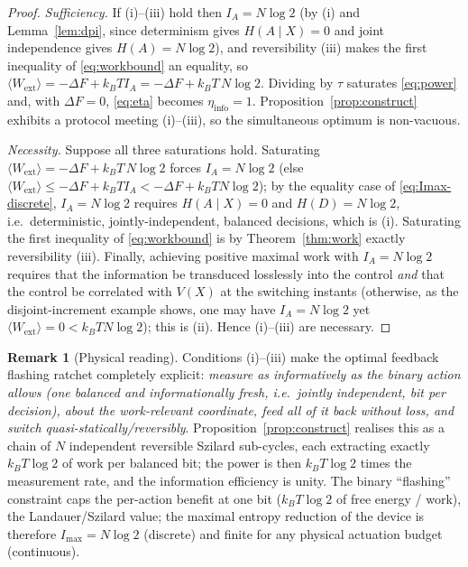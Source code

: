 \documentclass{amsart}
\theoremstyle{definition}
\newtheorem{remark}{Remark}
\newcommand{\kB}{k_{B}}
\newcommand{\Wext}{\langle W_{\mathrm{ext}}\rangle}
\begin{document}
\begin{proof}
\emph{Sufficiency.} If (i)--(iii) hold then $I_A=N\log2$ (by (i) and
Lemma~\ref{lem:dpi}, since determinism gives $H(A\mid X)=0$ and joint
independence gives $H(A)=N\log2$), and reversibility (iii) makes the first
inequality of \eqref{eq:workbound} an equality, so
$\Wext=-\Delta F+\kB T I_A=-\Delta F+\kB T\,N\log2$. Dividing by $\tau$
saturates \eqref{eq:power} and, with $\Delta F=0$, \eqref{eq:eta} becomes
$\eta_{\mathrm{info}}=1$. Proposition~\ref{prop:construct} exhibits a protocol
meeting (i)--(iii), so the simultaneous optimum is non-vacuous.

\emph{Necessity.} Suppose all three saturations hold. Saturating
$\Wext=-\Delta F+\kB T\,N\log2$ forces $I_A=N\log2$ (else
$\Wext\le-\Delta F+\kB T I_A<-\Delta F+\kB T N\log2$); by the equality case of
\eqref{eq:Imax-discrete}, $I_A=N\log2$ requires $H(A\mid X)=0$ and
$H(D)=N\log2$, i.e.\ deterministic, jointly-independent, balanced decisions,
which is (i). Saturating the first inequality of \eqref{eq:workbound} is by
Theorem~\ref{thm:work} exactly reversibility (iii). Finally, achieving positive
maximal work with $I_A=N\log2$ requires that the information be transduced
losslessly into the control \emph{and} that the control be correlated with
$V(X)$ at the switching instants (otherwise, as the disjoint-increment example
shows, one may have $I_A=N\log2$ yet $\Wext=0<\kB T N\log2$); this is (ii).
Hence (i)--(iii) are necessary.
\end{proof}

\begin{remark}[Physical reading]
Conditions (i)--(iii) make the optimal feedback flashing ratchet completely
explicit: \emph{measure as informatively as the binary action allows (one
balanced \emph{and informationally fresh}, i.e.\ jointly independent, bit per
decision), about the work-relevant coordinate, feed all of it back without
loss, and switch quasi-statically/reversibly}. Proposition~\ref{prop:construct}
realises this as a chain of $N$ independent reversible Szilard sub-cycles, each
extracting exactly $\kB T\log2$ of work per balanced bit; the power is then
$\kB T\log2$ times the measurement rate, and the information efficiency is
unity. The binary ``flashing'' constraint caps the per-action benefit at one
bit ($\kB T\log2$ of free energy / work), the Landauer/Szilard value; the
maximal entropy reduction of the device is therefore $I_{\max}=N\log2$
(discrete) and finite for any physical actuation budget (continuous).
\end{remark}
\end{document}

